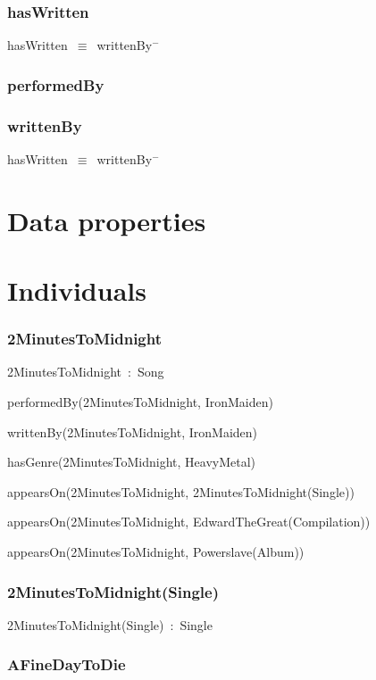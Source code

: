 \documentclass{article}
\begin{document}
\subsubsection*{hasWritten}

hasWritten~\ensuremath{\equiv}~writtenBy\ensuremath{^-}

\subsubsection*{performedBy}

\subsubsection*{writtenBy}

hasWritten~\ensuremath{\equiv}~writtenBy\ensuremath{^-}

\section*{Data properties}\section*{Individuals}\subsubsection*{2MinutesToMidnight}

2MinutesToMidnight~:~Song

performedBy(2MinutesToMidnight, IronMaiden)

writtenBy(2MinutesToMidnight, IronMaiden)

hasGenre(2MinutesToMidnight, HeavyMetal)

appearsOn(2MinutesToMidnight, 2MinutesToMidnight(Single))

appearsOn(2MinutesToMidnight, EdwardTheGreat(Compilation))

appearsOn(2MinutesToMidnight, Powerslave(Album))

\subsubsection*{2MinutesToMidnight(Single)}

2MinutesToMidnight(Single)~:~Single

\subsubsection*{AFineDayToDie}
\end{document}
